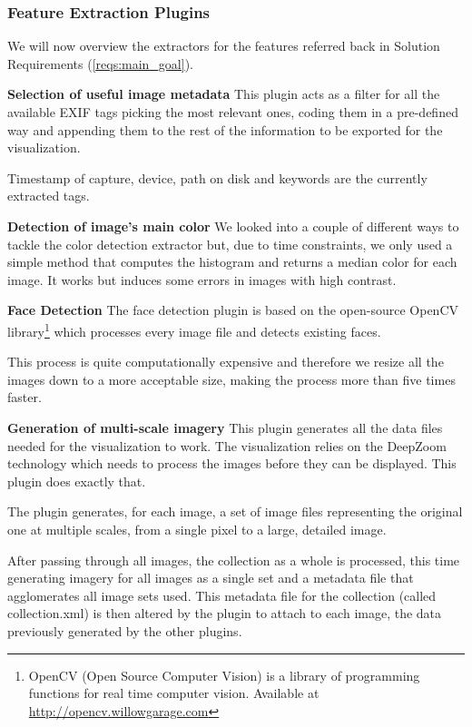 \subsubsection{Feature Extraction Plugins} %
\label{sub:plugins}

We will now overview the extractors for the features referred back in Solution Requirements (\ref{reqs:main_goal}).

\textbf{Selection of useful image metadata} This plugin acts as a filter for all the available \ac{EXIF} tags picking the most relevant ones, coding them in a pre-defined way and appending them to the rest of the information to be exported for the visualization.

Timestamp of capture, device, path on disk and keywords are the currently extracted tags.


\textbf{Detection of image’s main color} We looked into a couple of different ways to tackle the color detection extractor but, due to time constraints, we only used a simple method that computes the histogram and returns a median color for each image. It works but induces some errors in images with high contrast.


\textbf{Face Detection} The face detection plugin is based on the open-source OpenCV library\footnote{OpenCV (Open Source Computer Vision) is a library of programming functions for real time computer vision. Available at \url{http://opencv.willowgarage.com}} which processes every image file and detects existing faces.
 
This process is quite computationally expensive and therefore we resize all the images down to a more acceptable size, making the process more than five times faster.


\textbf{Generation of multi-scale imagery}
This plugin generates all the data files needed for the visualization to work. The visualization relies on the DeepZoom technology which needs to process the images before they can be displayed. This plugin does exactly that.

The plugin generates, for each image, a set of image files representing the original one at multiple scales, from a single pixel to a large, detailed image.

After passing through all images, the collection as a whole is processed, this time generating imagery for all images as a single set and a metadata file that agglomerates all image sets used. This metadata file for the collection (called collection.xml) is then altered by the plugin to attach to each image, the data previously generated by the other plugins.

